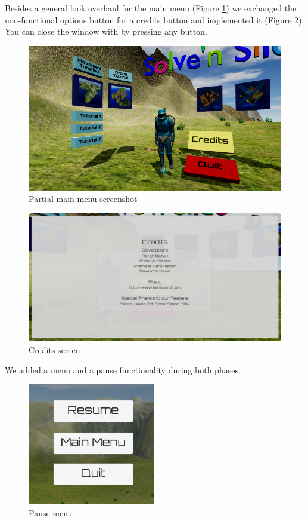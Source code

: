 \documentclass[12pt, letterpaper]{scrartcl}
\begin{document}
	Besides a general look overhaul for the main menu (Figure \ref{fig:mainMenuFinal}) we exchanged the non-functional options button for a credits button and implemented it (Figure \ref{fig:credits}). You can close the window with by pressing any button.
	\begin{figure}[H]
		\centering
		\includegraphics[width=\textwidth-1cm]{images/final/MainMenu1}
		\caption{Partial main menu screenshot}
		\label{fig:mainMenuFinal}
	\end{figure}
	\begin{figure}[H]
		\centering
		\includegraphics[width=\textwidth-1cm]{images/final/Credits}
		\caption{Credits screen}
		\label{fig:credits}
	\end{figure}
	We added a menu and a pause functionality during both phases.
	\begin{figure}[H]
		\centering
		\includegraphics[]{images/final/PauseMenu}
		\caption{Pause menu}
		\label{fig:pauseMenu}
	\end{figure}
	
\end{document}
